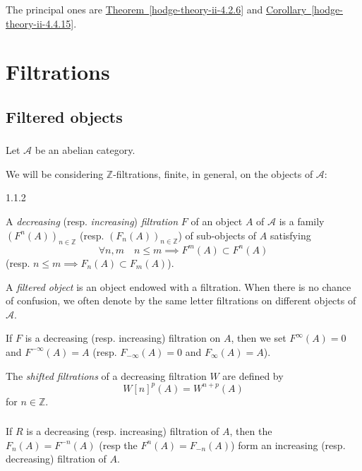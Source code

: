   The principal ones are \hyperref[hodge-theory-ii-4.2.6]{Theorem~\ref*{hodge-theory-ii-4.2.6}} and \hyperref[hodge-theory-ii-4.4.15]{Corollary~\ref*{hodge-theory-ii-4.4.15}}.\chapter{Filtrations}\thispagestyle{fancy}\label{hodge-theory-ii-1}\section{Filtered objects}\label{hodge-theory-ii-1.1}\subsection{}\label{hodge-theory-ii-1.1.1}\par{}Let \(\mathscr {A}\) be an abelian category.\par{}We will be considering \(\mathbb {Z}\)-filtrations, finite, in general, on the objects of \(\mathscr {A}\):\begin{definition}{1.1.2}\label{hodge-theory-ii-1.1.2}\skipsinglepar\par{}A \emph{decreasing} (resp. \emph{increasing}) \emph{filtration} \(F\) of an object \(A\) of \(\mathscr {A}\) is a family \((F^n(A))_{n\in \mathbb {Z}}\) (resp. \((F_n(A))_{n\in \mathbb {Z}}\)) of sub-objects of \(A\) satisfying
    \[       \forall  n,m       \quad  n\leqslant  m \implies  F^m(A)\subset  F^n(A)     \]
    (resp. \(n\leqslant  m\implies  F_n(A)\subset  F_m(A)\)).\par{}A \emph{filtered object} is an object endowed with a filtration.
    When there is no chance of confusion, we often denote by the same letter filtrations on different objects of \(\mathscr {A}\).\par{}If \(F\) is a decreasing (resp. increasing) filtration on \(A\), then we set \(F^\infty (A)=0\) and \(F^{-\infty }(A)=A\) (resp. \(F_{-\infty }(A)=0\) and \(F_\infty (A)=A\)).\par{}The \emph{shifted filtrations} of a decreasing filtration \(W\) are defined by
    \[       W[n]^p(A)       = W^{n+p}(A)     \]
    for \(n\in \mathbb {Z}\).\end{definition}\subsection{}\label{hodge-theory-ii-1.1.3}\par{}If \(R\) is a decreasing (resp. increasing) filtration of \(A\), then the \(F_n(A)=F^{-n}(A)\) (resp the \(F^n(A)=F_{-n}(A)\)) form an increasing (resp. decreasing) filtration of \(A\).
    
